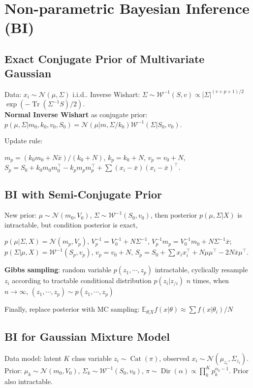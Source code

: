 \section{Non-parametric Bayesian Inference (BI)}

\subsection*{Exact Conjugate Prior of Multivariate Gaussian}
Data: $x_i\sim \mathcal{N}(\mu,\Sigma)$ i.i.d.. Inverse Wishart: $\Sigma \sim \mathcal{W}^{-1}(S, v) \propto |\Sigma|^{(v+p+1)/2}$ $\exp( - \operatorname{Tr}( \Sigma^{-1} S)/2 )$. \\
\textbf{Normal Inverse Wishart} as conjugate prior:\\ $p(\mu, \Sigma | m_0, k_0, v_0, S_0) = \mathcal{N}(\mu | m, \Sigma/k_0)\mathcal{W}^{-1}(\Sigma | S_0,v_0)$. 

Update rule: \begin{footnotesize}
    $m_p = (k_0 m_0+N\bar{x})/(k_0+N)$, $k_p = k_0 + N$, $v_p =v_0 + N$, $S_p =S_0 + k_0 m_0 m_0^{\top} - k_p m_p m_p^{\top} + \sum (x_i-\bar{x})(x_i-\bar{x})^{\top}$. 
\end{footnotesize}


\subsection*{BI with Semi-Conjugate Prior}
New prior: $\mu\sim \mathcal{N}(m_0,V_0)$, $\Sigma \sim \mathcal{W}^{-1}(S_0, v_0)$, then posterior $p(\mu,\Sigma | X)$ is intractable, but condition posterior is exact, \begin{footnotesize}
    $p(\mu | \Sigma, X) = \mathcal{N}(m_p,V_p)$, $V_p^{-1} = V_0^{-1} + N\Sigma^{-1}$, $V_p^{-1}m_p = V_0^{-1} m_0 + N\Sigma^{-1}\bar{x}$; $p(\Sigma | \mu, X) = \mathcal{W}^{-1}(S_p,v_p)$, $v_p = v_0 + N$, $S_p = S_0 +\sum x_ix_i^{\top} + N\mu\mu^{\top} - 2N\bar{x}\mu^{\top}$. 
\end{footnotesize}

\textbf{Gibbs sampling}: random variable $p(z_1,\cdots, z_p)$ intractable, cyclically resample $z_i$ according to tractable conditional distribution $p(z_i | z_{/i})$ $n$ times, when $n\to \infty$, $(z_1,\cdots, z_p)\sim p(z_1,\cdots, z_p)$ 

Finally, replace posterior with MC sampling: $\mathbb{E}_{\theta | X} f(x| \theta) \approx \sum f(x| \theta_i) / N$

\subsection*{BI for Gaussian Mixture Model}
Data model: latent $K$ class variable $z_i \sim \operatorname{Cat}(\pi)$, observed $x_i\sim \mathcal{N}(\mu_{z_i}, \Sigma_{z_i})$. Prior: $\mu_k \sim \mathcal{N}(m_0,V_0)$, $\Sigma_k \sim \mathcal{W}^{-1}(S_0, v_0)$, $\pi\sim \operatorname{Dir}(\alpha)\propto\prod_k^{K} p_{k}^{\alpha_k-1}$. Prior also intractable. 

